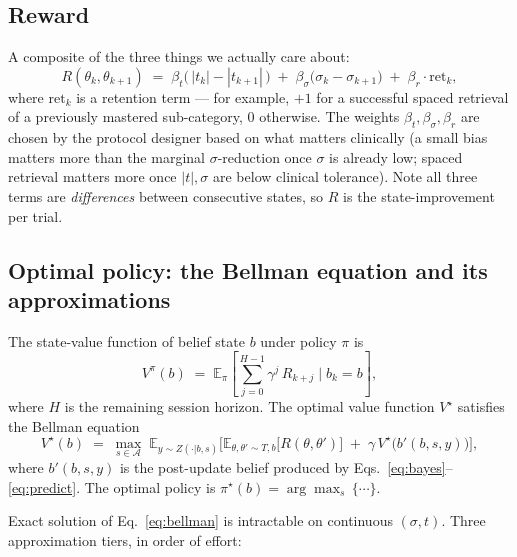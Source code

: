 \documentclass[11pt]{article}
\begin{document}
\subsection{Reward}
\label{sec:reward}

A composite of the three things we actually care about:
\begin{equation}
  R(\theta_k, \theta_{k+1})
  \;=\;
  \beta_t \bigl(\,|t_k| - |t_{k+1}|\,\bigr)
  \;+\;
  \beta_\sigma \bigl(\sigma_k - \sigma_{k+1}\bigr)
  \;+\;
  \beta_r \cdot \mathrm{ret}_k,
  \label{eq:reward}
\end{equation}
where $\mathrm{ret}_k$ is a retention term — for example, $+1$ for a
successful spaced retrieval of a previously mastered sub-category,
$0$ otherwise. The weights $\beta_t, \beta_\sigma, \beta_r$ are
chosen by the protocol designer based on what matters clinically (a
small bias matters more than the marginal $\sigma$-reduction once
$\sigma$ is already low; spaced retrieval matters more once
$|t|, \sigma$ are below clinical tolerance). Note all three terms
are \emph{differences} between consecutive states, so $R$ is the
state-improvement per trial.

\subsection{Optimal policy: the Bellman equation and its
approximations}
\label{sec:policy-formal}

The state-value function of belief state $b$ under policy $\pi$ is
\begin{equation}
  V^{\pi}(b) \;=\;
    \mathbb{E}_{\pi}\!\left[
      \sum_{j = 0}^{H-1} \gamma^{j}\,R_{k+j}
      \;\Big|\; b_k = b
    \right],
  \label{eq:value}
\end{equation}
where $H$ is the remaining session horizon. The optimal value
function $V^{\star}$ satisfies the Bellman equation
\begin{equation}
  V^{\star}(b) \;=\;
    \max_{s \in \mathcal{A}}\;
    \mathbb{E}_{y \sim Z(\cdot | b, s)}\!
    \biggl[
      \mathbb{E}_{\theta, \theta' \sim T, b}\!\bigl[R(\theta, \theta')\bigr]
      \;+\; \gamma\,V^{\star}\!\bigl(b'(b, s, y)\bigr)
    \biggr],
  \label{eq:bellman}
\end{equation}
where $b'(b, s, y)$ is the post-update belief produced by
Eqs.~\ref{eq:bayes}--\ref{eq:predict}. The optimal policy is
$\pi^{\star}(b) = \arg\max_s\,\{\cdots\}$.

Exact solution of Eq.~\ref{eq:bellman} is intractable on continuous
$(\sigma, t)$. Three approximation tiers, in order of effort:
\end{document}
